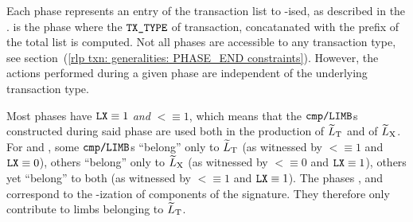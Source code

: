 Each phase represents an entry of the transaction list to \rlp{}-ised, as described in the \cite{EYP-London}.
\phaseRlpPrefix{} is the phase where the $\texttt{TX\_TYPE}$ of transaction,
concatanated with the \rlp{} prefix of the total list is computed.
Not all phases are accessible to any transaction type,
see section~(\ref{rlp txn: generalities: PHASE_END constraints}).
However, the actions performed during a given phase are independent of the underlying transaction type.

Most phases have $\texttt{LX} \equiv 1$ \emph{and} $\lt \equiv 1$,
which means that the $\texttt{cmp}\texttt{/}\texttt{{\texttt{LIMB}}}$s constructed during said phase
are used both in the production of
$\widetilde{L}_{\mathrm{T}}$ and of
$\widetilde{L}_{\mathrm{X}}$.
For \phaseRlpPrefix{} and \phaseBeta{},
some $\texttt{cmp}\texttt{/}\texttt{{\texttt{LIMB}}}$s ``belong'' only to $\widetilde{L}_{\mathrm{T}}$ (as witnessed by $\lt \equiv 1$ and $\texttt{LX} \equiv 0$),
others        ``belong'' only to $\widetilde{L}_{\mathrm{X}}$ (as witnessed by $\lt \equiv 0$ and $\texttt{LX} \equiv 1$),
others yet    ``belong'' to both               (as witnessed by $\lt \equiv 1$ and $\texttt{LX} \equiv 1$).
The phases \phaseY{}, \phaseR{} and \phaseS{} correspond to the \rlp{}-ization of components of the signature.
They therefore only contribute to limbs belonging to $\widetilde{L}_{\mathrm{T}}$.

